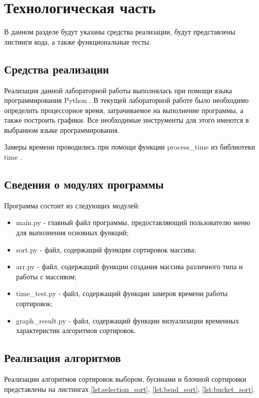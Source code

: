 \chapter{Технологическая часть}

В данном разделе будут указаны средства реализации, будут представлены листинги кода, а также функциональные тесты.

\section{Средства реализации}

Реализация данной лабораторной работы выполнялась при помощи языка программирования Python \cite{python}. 
В текущей лабораторной работе было необходимо определить процессорное время, затрачиваемое на выполнение программы, а также построить графики. 
Все необходимые инструменты для этого имеются в выбранном языке программирования.

Замеры времени проводились при помощи функции process\_time из библиотеки time \cite{python-time}.

\section{Сведения о модулях программы}

Программа состоит из следующих модулей:

\begin{itemize}
	\item main.py - главный файл программы, предоставляющий пользователю меню для выполнения основных функций;
	\item sort.py - файл, содержащий функции сортировок массива;
	\item arr.py - файл, содержащий функции создания массива различного типа и работы с массивом;
	\item time\_test.py - файл, содержащий функции замеров времени работы сортировок;
	\item graph\_result.py - файл, содержащий функции визуализации временных характеристик алгоритмов сортировок.
\end{itemize}

\section{Реализация алгоритмов}

Реализации алгоритмов сортировок выбором, бусинами и блочной сортировки представлены на листингах \ref{lst:selection_sort}, \ref{lst:bead_sort}, \ref{lst:bucket_sort}.

